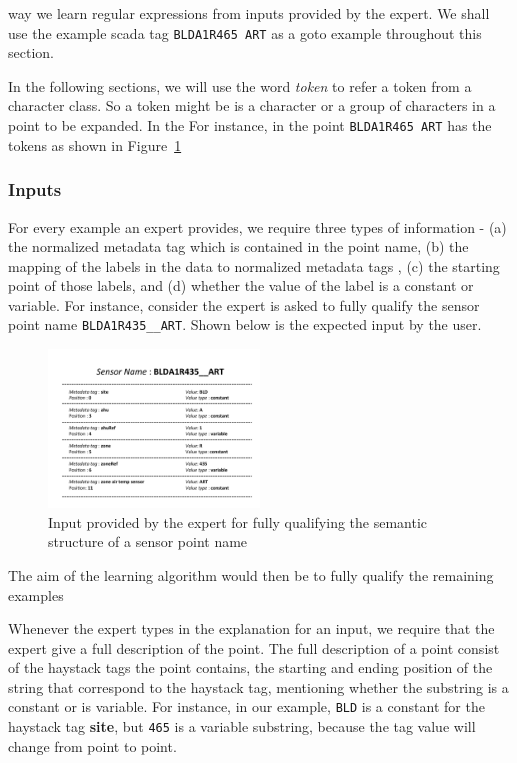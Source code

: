  way we learn regular expressions from inputs provided by the expert. We shall use the example scada tag {\tt BLDA1R465  ART} as a goto example throughout this section.

In the following sections, we will use the word {\it token} to refer a token from a character class. So a token might be is a character or a group of characters in a point to be expanded. In the For instance, in the point {\tt BLDA1R465 ART} has the tokens as shown in Figure~\ref{fig:exampleInput}


\subsubsection{Inputs}

For every example an expert provides, we require three types of information - (a) the normalized metadata tag which is contained in the point name,  (b) the mapping of the labels in the data to normalized metadata tags , (c) the starting point of those labels, and (d) whether the value of the label is a constant or variable. For instance, consider the expert is asked to fully qualify the sensor point name \texttt{BLDA1R435\_\_ART}. Shown below is the expected input by the user.

\begin{figure}[h!]
  
  \centering
    \includegraphics[width=0.5\textwidth]{figs/inputExample.pdf}
\caption{Input provided by the expert for fully qualifying the semantic structure of a sensor point name}
\label{fig:exampleInput}
\end{figure}

The aim of the learning algorithm would then be to fully qualify the remaining examples



Whenever the expert types in the explanation for an input, we require that the expert give a full description of the point. The full description of a point consist of the haystack tags the point contains, the starting and ending position of the string that correspond to the haystack tag, mentioning whether the substring is a constant or is variable. For instance, in our example, {\tt BLD} is a constant for the haystack tag {\bf site}, but {\tt 465} is a variable substring, because the tag value will change from point to point. 


